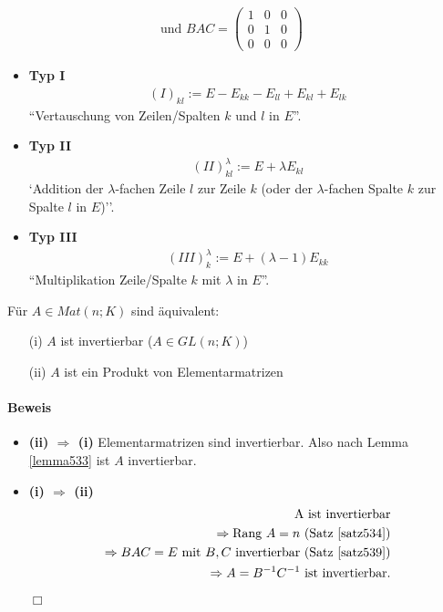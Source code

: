 \documentclass[11pt]{report}
\newcommand*\f[1] {\textbf{#1}}
\begin{document}
\begin{align}
\text{und } BAC = \begin{pmatrix} 1 & 0 & 0 \\ 0 & 1 & 0 \\ 0 & 0 & 0\end{pmatrix}&
\end{align}


\begin{itemize}
 \item \f{Typ I}
\begin{align}
 (I)_{kl} := E - E_{kk} - E_{ll} + E_{kl} + E_{lk}
\end{align}
``Vertauschung von Zeilen/Spalten $k$ und $l$ in $E$''.
 \item \f{Typ II}
\begin{align}
 (II)^{\lambda}_{kl} := E + \lambda E_{kl}
\end{align}
`Addition der $\lambda$-fachen Zeile $l$ zur Zeile $k$ (oder der $\lambda$-fachen Spalte $k$ zur Spalte $l$ in $E$)''.
 \item \f{Typ III}
\begin{align}
 (III)^{\lambda}_{k} := E + (\lambda-1) E_{kk}
\end{align}
``Multiplikation Zeile/Spalte $k$ mit $\lambda$ in $E$''.
\end{itemize}

\begin{korollar}
\label{korollar5310}
Für $A \in Mat(n;K)$ sind äquivalent:
\begin{itemize}
\item[(i)] $A$ ist invertierbar ($A \in GL(n;K)$)
\item[(ii)] $A$ ist ein Produkt von Elementarmatrizen
\end{itemize}
\end{korollar}

\paragraph{Beweis}
\begin{itemize}
\item \f{(ii) $\Rightarrow$ (i)} Elementarmatrizen sind invertierbar. Also nach Lemma \ref{lemma533} ist $A$ invertierbar.
\item \f{(i) $\Rightarrow$ (ii)} 
\begin{align}
\text{A ist invertierbar} \\
\Rightarrow \text{Rang } A = n \text{ (Satz \ref{satz534})} \\
\Rightarrow BAC = E \text{ mit $B, C$ invertierbar (Satz \ref{satz539})} \\
\Rightarrow A = B^{-1} C^{-1} \text{ ist invertierbar.}
\end{align}
\hspace*{1cm} \hfill $\Box$
\end{itemize}
\end{document}
